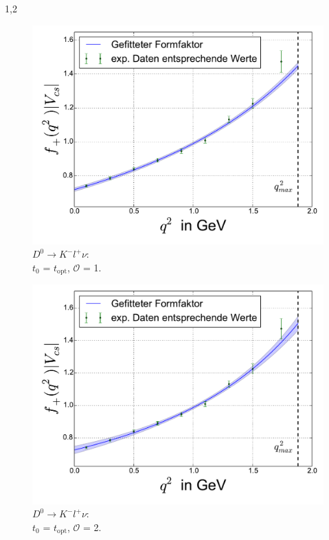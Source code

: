 \documentclass[11pt,a4paper,twoside]{report}
\begin{document}
\begin{spacing}{1,2}
 \begin{minipage}[H]{0.45\textwidth}
 \begin{figure}[H]
 \includegraphics[width=1\textwidth]{Fit/D0-1Ord-t0.pdf}
 \caption{$D^0\rightarrow K^- l^+ \nu$: \\$t_0$ = $t_{\text{opt}}$, $\mathcal{O}$ = 1.}
 \label{pic_D0-1Ord-t0}
 \end{figure}
 \end{minipage}
 \hfill
 \begin{minipage}[H]{0.45\textwidth}
 \begin{figure}[H]
 \includegraphics[width=1\textwidth]{Fit/D0-2Ord-t0.pdf}
 \caption{$D^0\rightarrow K^- l^+ \nu$: \\$t_0$ = $t_{\text{opt}}$, $\mathcal{O}$ = 2.}
 \label{pic_D0-2Ord-t0}
 \end{figure}
 \end{minipage}
 

\end{spacing}
\end{document}
